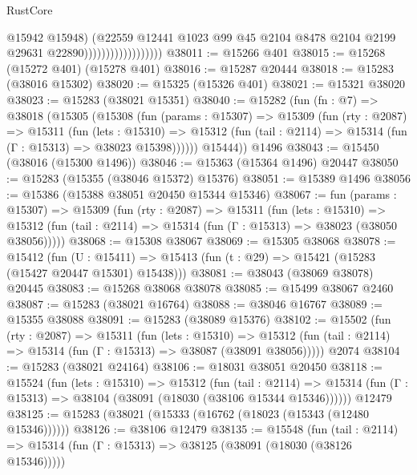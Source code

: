\begin{lexlean}{RustCore}
\begin{coremodule}
                                        @15942
                                        @15948)
                                      (@22559
                                        @12441
                                        @1023
                                        @99
                                        @45
                                        @2104
                                        @8478
                                        @2104
                                        @2199
                                        @29631
                                        @22890))))))))))))))))))
@38011 := @15266 @401
@38015 := @15268 (@15272 @401) (@15278 @401)
@38016 := @15287 @20444
@38018 := @15283 (@38016 @15302)
@38020 := @15325 (@15326 @401)
@38021 := @15321 @38020
@38023 := @15283 (@38021 @15351)
@38040 := @15282
    (fun (fn : @7) =>
    @38018
      (@15305
        (@15308
          (fun (params : @15307) =>
          @15309
            (fun (rty : @2087) =>
            @15311
              (fun (lets : @15310) =>
              @15312 (fun (tail : @2114) => @15314 (fun (Γ : @15313) => @38023 @15398))))))
        @15444))
    @1496
@38043 := @15450 (@38016 (@15300 @1496))
@38046 := @15363 (@15364 @1496) @20447
@38050 := @15283 (@15355 (@38046 @15372) @15376)
@38051 := @15389 @1496
@38056 := @15386 (@15388 @38051 @20450 @15344 @15346)
@38067 := fun (params : @15307) =>
  @15309
    (fun (rty : @2087) =>
    @15311
      (fun (lets : @15310) =>
      @15312 (fun (tail : @2114) => @15314 (fun (Γ : @15313) => @38023 (@38050 @38056)))))
@38068 := @15308 @38067
@38069 := @15305 @38068
@38078 := @15412
    (fun (U : @15411) => @15413 (fun (t : @29) => @15421 (@15283 (@15427 @20447 @15301) @15438)))
@38081 := @38043 (@38069 @38078) @20445
@38083 := @15268 @38068 @38078
@38085 := @15499 @38067 @2460
@38087 := @15283 (@38021 @16764)
@38088 := @38046 @16767
@38089 := @15355 @38088
@38091 := @15283 (@38089 @15376)
@38102 := @15502
    (fun (rty : @2087) =>
    @15311
      (fun (lets : @15310) =>
      @15312 (fun (tail : @2114) => @15314 (fun (Γ : @15313) => @38087 (@38091 @38056)))))
    @2074
@38104 := @15283 (@38021 @24164)
@38106 := @18031 @38051 @20450
@38118 := @15524
    (fun (lets : @15310) =>
    @15312
      (fun (tail : @2114) =>
      @15314 (fun (Γ : @15313) => @38104 (@38091 (@18030 (@38106 @15344 @15346))))))
    @12479
@38125 := @15283 (@38021 (@15333 (@16762 (@18023 (@15343 (@12480 @15346))))))
@38126 := @38106 @12479
@38135 := @15548
    (fun (tail : @2114) => @15314 (fun (Γ : @15313) => @38125 (@38091 (@18030 (@38126 @15346)))))

\end{coremodule}
\end{lexlean}
